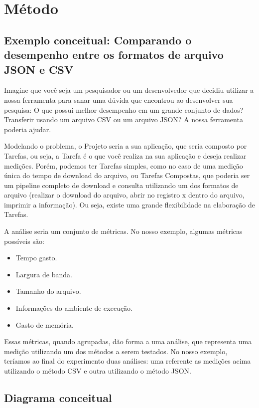 \documentclass[12pt]{tcc}
\begin{document}
\chapter{Método} 
	\label{sec:metodologia}

\section{Exemplo conceitual: Comparando o desempenho entre os formatos de arquivo JSON e CSV}

Imagine que você seja um pesquisador ou um desenvolvedor que decidiu utilizar a nossa ferramenta para sanar uma dúvida que encontrou ao desenvolver sua pesquisa:
O que possui melhor desempenho em um grande conjunto de dados? Transferir usando um arquivo CSV ou um arquivo JSON? A nossa ferramenta poderia ajudar.

Modelando o problema, o Projeto seria a sua aplicação, que seria composto por Tarefas, ou seja, a Tarefa é o que você realiza na sua aplicação e deseja realizar medições. Porém, podemos ter Tarefas simples, como no caso de uma medição única do tempo de download do arquivo, ou Tarefas Compostas, que poderia ser um pipeline completo de download e consulta utilizando um dos formatos de arquivo (realizar o download do arquivo, abrir no registro x dentro do arquivo, imprimir a informação). Ou seja, existe uma grande flexibilidade na elaboração de Tarefas.

A análise seria um conjunto de métricas. No nosso exemplo, algumas métricas possíveis são:

\begin{itemize}
	\item Tempo gasto.
	\item Largura de banda.
	\item Tamanho do arquivo.
	\item Informações do ambiente de execução.
	\item Gasto de memória.
\end{itemize}

Essas métricas, quando agrupadas, dão forma a uma análise, que representa uma medição utilizando um dos métodos a serem testados. No nosso exemplo, teríamos ao final do experimento duas análises: uma referente as medições acima utilizando o método CSV e outra utilizando o método JSON.

\section{Diagrama conceitual}
\end{document}
